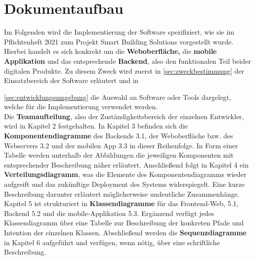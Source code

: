 \section{Dokumentaufbau}\label{sec:dokumentaufbau}
Im Folgenden wird die Implementierung der Software spezifiziert,  wie sie im Pflichtenheft 2021 zum Projekt Smart Building Solutions vorgestellt wurde.  Hierbei handelt es sich konkrekt um die \textbf{Weboberfl\"ache,}  die \textbf{mobile Applikation} und das entsprechende \textbf{Backend},  also den funktionalen Teil beider digitalen Produkte.
Zu diesem Zweck wird zuerst in \ref{sec:zweckbestimmung} der Einsatzbereich der Software erl\"autert und in  {\ref{sec:entwicklungsumgebung} die Auswahl an Software oder Tools dargelegt,  welche f\"ur die Implementierung verwendet werden. \\
Die \textbf{Teamaufteilung},  also der Zust\"andigkeitsbereich der einzelnen Entwickler,  wird in Kapitel 2 festgehalten. 
In Kapitel 3 befinden sich die \textbf{Komponentendiagramme} des Backends 3.1,  der Weboberfl\"ache bzw.  des Webservers 3.2 und der mobilen App 3.3 in dieser Reihenfolge.  In Form einer Tabelle werden unterhalb der Abbildungen die jeweiligen Komponenten mit entsprechender Beschreibung n\"aher erl\"autert.
Anschlie{\ss}end folgt in Kapitel 4 ein \textbf{Verteilungsdiagramm},  was die Elemente des Komponentendiagramms wieder aufgreift und das zuk\"unftige Deployment des Systems widerspiegelt.  Eine kurze Beschreibung darunter erl\"autert m\"oglicherweise undeutliche Zusammenh\"ange.
Kapitel 5 ist strukturiert in \textbf{Klassendiagramme} f\"ur das Frontend-Web,  5.1,  Backend 5.2  und die mobile-Applikation 5.3.
Erg\"anzend verf\"ugt jedes Klassendiagramm \"uber eine Tabelle zur Beschreibung der konkreten Pfade und Intention der einzelnen Klassen.
Abschlie{\ss}end werden die \textbf{Sequenzdiagramme} in Kapitel 6 aufgef\"uhrt und verf\"ugen, wenn n\"otig, \"uber eine schriftliche Beschreibung.




}
